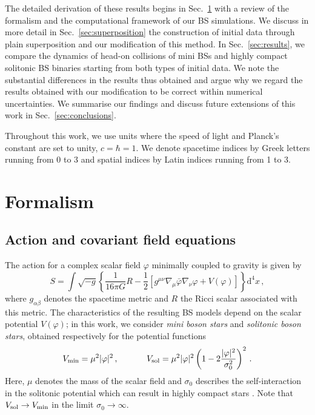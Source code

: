 \documentclass[]{iopart}
\newcommand{\du}{\mathrm{d}}
\begin{document}
%
The detailed derivation of these results begins in Sec.~\ref{sec:formalism}
with a review of the formalism and the computational framework of
our BS simulations. We discuss in more detail in
Sec.~\ref{sec:superposition} the construction of initial data through
plain superposition and our modification of this method. In
Sec.~\ref{sec:results}, we compare the dynamics of head-on collisions
of mini BSs and highly compact solitonic BS binaries starting from
both types of initial data. We note the substantial differences in
the results thus obtained and argue why we regard the results
obtained with our modification to be correct within numerical
uncertainties.  We summarise our findings and discuss future
extensions of this work in Sec.~\ref{sec:conclusions}.

Throughout this work, we use units where the speed of light and
Planck's constant are set to unity, $c=\hbar=1$. We denote spacetime
indices by Greek letters running from 0 to 3 and spatial indices
by Latin indices running from 1 to 3.


\section{Formalism}
\label{sec:formalism}

\subsection{Action and covariant field equations}
%
The action for a complex scalar field $\varphi$ minimally coupled
to gravity is given by
%
\begin{equation}
S = \int\sqrt{-g}\left\{
  \frac{1}{16\pi G}R - \frac{1}{2}\left[ 
  g^{\mu \nu}\nabla_{\mu}\bar{\varphi}\nabla_{\nu}\varphi
  + V(\varphi)\right] \right\} \du^4 x\,,
  \label{eq:action}
\end{equation}
%
where $g_{\alpha\beta}$ denotes the spacetime metric and $R$ the
Ricci scalar associated with this metric. The characteristics of
the resulting BS models depend on the scalar potential $V(\varphi)$;
in this work, we consider {\it mini boson stars} and {\it solitonic
boson stars}, obtained respectively for the potential functions
%
\begin{equation}
  V_{\rm min} = \mu^2 |\varphi|^2\,,~~~~~~~~~~
  V_{\rm sol} = \mu^2 |\varphi|^2\left(1-2\frac{|\varphi|^2}{\sigma_0^2}
  \right)^2\,.
  \label{eq:pot}
\end{equation}
%
Here, $\mu$ denotes the mass of the scalar field and $\sigma_0$
describes the self-interaction in the solitonic potential which can
result in highly compact stars \cite{Lee:1986ts}. Note that $V_{\rm
sol}\rightarrow V_{\rm min}$ in the limit $\sigma_0\rightarrow
\infty$.
\end{document}
